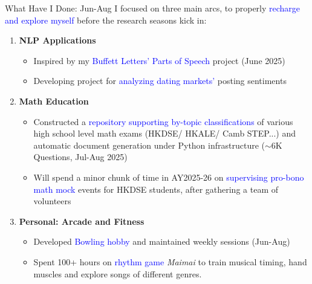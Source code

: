 \documentclass[xcolor=dvipsnames]{beamer}
\begin{document}
\begin{frame}{What Have I Done: Jun-Aug}
    I focused on three main arcs, to properly \textcolor{blue}{recharge and explore myself} before the
    research seasons kick in:
    \begin{enumerate}
    \item \textbf{NLP Applications}
        \begin{itemize}
        \item Inspired by my \textcolor{blue}{Buffett Letters' Parts of Speech} project (June 2025)
        \item Developing project for \textcolor{blue}{analyzing dating markets'} posting sentiments 
        \end{itemize}
    \item \textbf{Math Education}
        \begin{itemize}
        \item Constructed a \textcolor{blue}{repository supporting by-topic classifications} of 
            various high school level math exams (HKDSE/ HKALE/ Camb STEP...) and automatic document 
            generation under Python infrastructure ($\sim$6K Questions, Jul-Aug 2025)
        \item Will spend a minor chunk of time in AY2025-26 on \textcolor{blue}{supervising pro-bono math mock} events 
            for HKDSE students, after gathering a team of volunteers
        \end{itemize}
    \item \textbf{Personal: Arcade and Fitness}
        \begin{itemize}
        \item Developed \textcolor{blue}{Bowling hobby} and maintained weekly sessions (Jun-Aug)
        \item Spent 100+ hours on \textcolor{blue}{rhythm game} \textit{Maimai} to train musical timing, hand 
            muscles and explore songs of different genres. 
        \end{itemize}
    \end{enumerate}
\end{frame}
\end{document}
